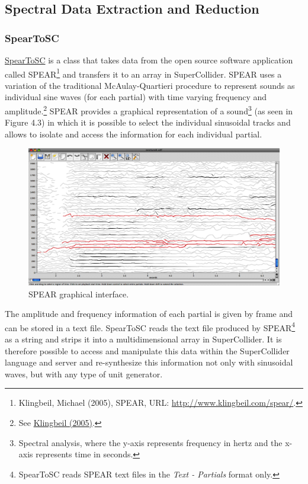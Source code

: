 \subsection{Spectral Data Extraction and Reduction}

\hypertarget{spearsc}{}
\subsubsection{SpearToSC}

\href{http://github.com/freuben/FedeLib/blob/master/SpearToSC/SpearToSC.sc}{SpearToSC} is a class that takes data from the open source software application called SPEAR\footnote{Klingbeil, Michael (2005), SPEAR, URL: \href{http://www.klingbeil.com/spear/}{http://www.klingbeil.com/spear/}.} and transfers it to an array in SuperCollider. SPEAR uses a variation of the traditional McAulay-Quartieri procedure to represent sounds as individual sine waves (for each partial) with time varying frequency and amplitude.\footnote{See \hyperlink{klingbeil}{Klingbeil (2005)}.} SPEAR provides a graphical representation of a sound\footnote{Spectral analysis, where the y-axis represents frequency in hertz and the x-axis represents time in seconds.} (as seen in Figure 4.3) in which it is possible to select the individual sinusoidal tracks and allows to isolate and access the information for each individual partial. 
\begin{figure}[htbp] %
   \centering
   \includegraphics[width=15cm]{Chapter6/Spear1.tif} %
   \caption{SPEAR graphical interface.}
   \label{fig:example}
\end{figure}
The amplitude and frequency information of each partial is given by frame and can be stored in a text file. SpearToSC reads the text file produced by SPEAR\footnote{SpearToSC reads SPEAR text files in the \emph{Text - Partials} format only.} as a string and strips it into a multidimensional array in SuperCollider. It is therefore possible to access and manipulate this data within the SuperCollider language and server and re-synthesize this information not only with sinusoidal waves, but with any type of unit generator. 

